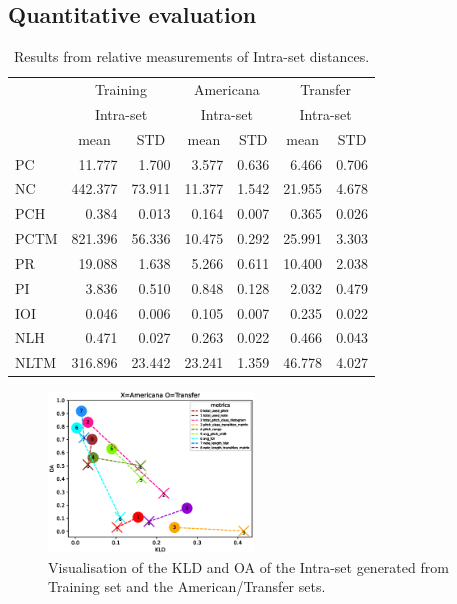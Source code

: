 \documentclass{IEEEtran}
\begin{document}
\subsection{Quantitative evaluation}

\begin{table}
    \begin{center}
    \caption{
        Results from relative measurements of Intra-set distances.
        \label{tab:q_results}
    }
    \begin{tabular}{l|rr|rr|rr}
        \multirow{3}{*}{} & \multicolumn{2}{c|}{Training}
            & \multicolumn{2}{c|}{Americana} & \multicolumn{2}{c}{Transfer} \\
        \cline{2-7} & \multicolumn{2}{c|}{Intra-set} & \multicolumn{2}{c|}{Intra-set}
            & \multicolumn{2}{c}{Intra-set} \\
        \cline{2-7} & \multicolumn{1}{c|}{mean} & \multicolumn{1}{c|}{STD}
            & \multicolumn{1}{c|}{mean} & \multicolumn{1}{c|}{STD} 
            & \multicolumn{1}{c|}{mean} & \multicolumn{1}{c}{STD} \\ \hline
        PC & 11.777 & 1.700 & 3.577 & 0.636 & 6.466 & 0.706 \\
        NC & 442.377 & 73.911 & 11.377 & 1.542 & 21.955 & 4.678 \\
        PCH & 0.384 & 0.013 & 0.164 & 0.007 & 0.365 & 0.026 \\
        PCTM & 821.396 & 56.336 & 10.475 & 0.292 & 25.991 & 3.303 \\
        PR & 19.088 & 1.638 & 5.266 & 0.611 & 10.400 & 2.038 \\
        PI & 3.836 & 0.510 & 0.848 & 0.128 & 2.032 & 0.479 \\
        IOI & 0.046 & 0.006 & 0.105 & 0.007 & 0.235 & 0.022 \\
        NLH & 0.471 & 0.027 & 0.263 & 0.022 & 0.466 & 0.043 \\
        NLTM & 316.896 & 23.442 & 23.241 & 1.359 & 46.778 & 4.027
    \end{tabular}
    \end{center}
\end{table}

\begin{figure}
    \centering
    \includegraphics[width=0.485\textwidth]{gen_intra_gen_training_inter}
    \caption{
        Visualisation of the KLD and OA of the Intra-set generated from
        Training set and the American/Transfer sets.
        \label{fig:gen_intra_gen_training_inter}
    }
\end{figure}
\end{document}
